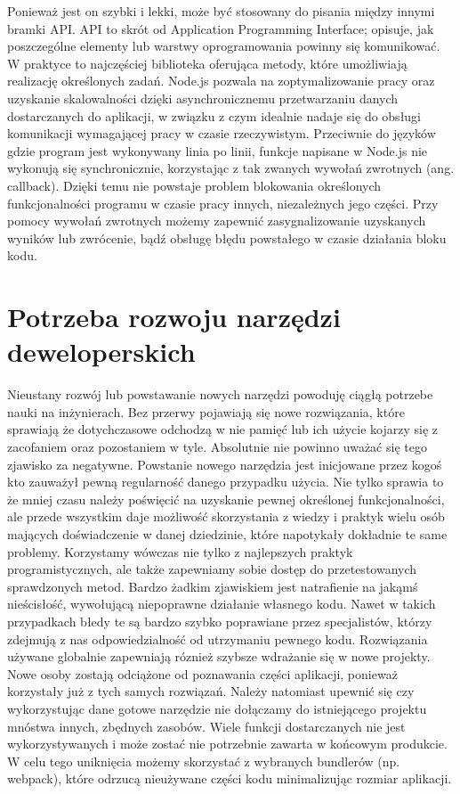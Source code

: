 \documentclass[12pt]{report}
\begin{document}
  Ponieważ jest on szybki i lekki, może być stosowany do pisania między innymi bramki API.
  API to skrót od Application Programming Interface; opisuje, jak poszczególne elementy lub warstwy oprogramowania powinny się komunikować.
  W praktyce to najczęściej biblioteka oferująca metody, które umożliwiają realizację określonych zadań.
  Node.js pozwala na zoptymalizowanie pracy oraz uzyskanie skalowalności dzięki asynchronicznemu przetwarzaniu danych dostarczanych do aplikacji, w związku z czym idealnie nadaje się do obsługi komunikacji wymagającej pracy w czasie rzeczywistym. 
  Przeciwnie do języków gdzie program jest wykonywany linia po linii, funkcje napisane w Node.js nie wykonują się synchronicznie, korzystając z tak zwanych wywołań zwrotnych (ang. callback).
  Dzięki temu nie powstaje problem blokowania określonych funkcjonalności programu w czasie pracy innych, niezależnych jego części.
  Przy pomocy wywołań zwrotnych możemy zapewnić zasygnalizowanie uzyskanych wyników lub zwrócenie, bądź obsługę błędu powstałego w czasie działania bloku kodu.

  \section{Potrzeba rozwoju narzędzi deweloperskich}
  Nieustany rozwój lub powstawanie nowych narzędzi powoduję ciągłą potrzebe nauki na inżynierach.
  Bez przerwy pojawiają się nowe rozwiązania, które sprawiają że dotychczasowe odchodzą w nie pamięć lub ich użycie kojarzy się z zacofaniem oraz pozostaniem w tyle.
  Absolutnie nie powinno uważać się tego zjawisko za negatywne.
  Powstanie nowego narzędzia jest inicjowane przez kogoś kto zauważył pewną regularność danego przypadku użycia.
  Nie tylko sprawia to że mniej czasu należy poświęcić na uzyskanie pewnej określonej funkcjonalności, ale przede wszystkim daje możliwość skorzystania z wiedzy i praktyk wielu osób mających doświadczenie w danej dziedzinie, które napotykały dokładnie te same problemy.
  Korzystamy wówczas nie tylko z najlepszych praktyk programistycznych, ale także zapewniamy sobie dostęp do przetestowanych sprawdzonych metod.
  Bardzo żadkim zjawiskiem jest natrafienie na jakąmś nieścisłość, wywołującą niepoprawne działanie własnego kodu.
  Nawet w takich przypadkach błedy te są bardzo szybko poprawiane przez specjalistów, którzy zdejmują z nas odpowiedzialność od utrzymaniu pewnego kodu.
  Rozwiązania używane globalnie zapewniają róznież szybsze wdrażanie się w nowe projekty.
  Nowe osoby zostają odciążone od poznawania części aplikacji, ponieważ korzystały już z tych samych rozwiązań.
  Należy natomiast upewnić się czy wykorzystując dane gotowe narzędzie nie dołączamy do istniejącego projektu mnóstwa innych, zbędnych zasobów.
  Wiele funkcji dostarczanych nie jest wykorzystywanych i może zostać nie potrzebnie zawarta w końcowym produkcie.
  W celu tego uniknięcia możemy skorzystać z wybranych bundlerów (np. webpack), które odrzucą nieużywane części kodu minimalizując rozmiar aplikacji.
\end{document}
